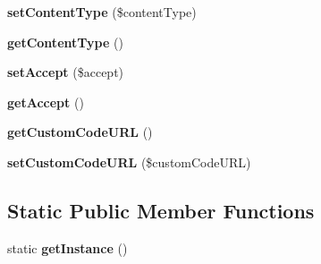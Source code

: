 \begin{DoxyCompactItemize}
\item 
\hypertarget{class_app42_config_a945b1a5744b810fcb31a05f827356cfa}{{\bfseries set\+Content\+Type} (\$content\+Type)}\label{class_app42_config_a945b1a5744b810fcb31a05f827356cfa}

\item 
\hypertarget{class_app42_config_aa843137beb02bc2516fe0551c00ff7d7}{{\bfseries get\+Content\+Type} ()}\label{class_app42_config_aa843137beb02bc2516fe0551c00ff7d7}

\item 
\hypertarget{class_app42_config_a44b73d734682a05093f9670c0dd82e66}{{\bfseries set\+Accept} (\$accept)}\label{class_app42_config_a44b73d734682a05093f9670c0dd82e66}

\item 
\hypertarget{class_app42_config_a77a626e2e034a997640b15e913c9aa5e}{{\bfseries get\+Accept} ()}\label{class_app42_config_a77a626e2e034a997640b15e913c9aa5e}

\item 
\hypertarget{class_app42_config_a44b9203da26f6f6d1c4606d9442e82a7}{{\bfseries get\+Custom\+Code\+U\+R\+L} ()}\label{class_app42_config_a44b9203da26f6f6d1c4606d9442e82a7}

\item 
\hypertarget{class_app42_config_a579f959c802ae3f2287563737f573520}{{\bfseries set\+Custom\+Code\+U\+R\+L} (\$custom\+Code\+U\+R\+L)}\label{class_app42_config_a579f959c802ae3f2287563737f573520}

\end{DoxyCompactItemize}
\subsection*{Static Public Member Functions}
\begin{DoxyCompactItemize}
\item 
\hypertarget{class_app42_config_ac93fbec81f07e5d15f80db907e63dc10}{static {\bfseries get\+Instance} ()}\label{class_app42_config_ac93fbec81f07e5d15f80db907e63dc10}

\end{DoxyCompactItemize}
